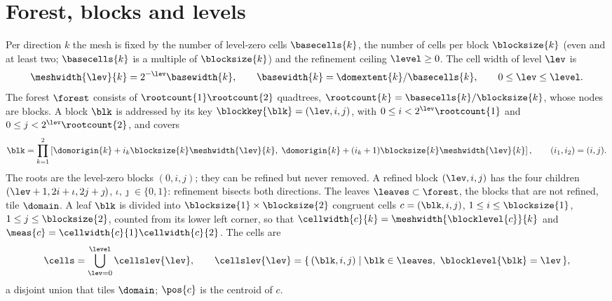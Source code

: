 \section{Forest, blocks and levels}\label{sec:mesh:forest}
Per direction $k$ the mesh is fixed by the number of level-zero cells
$\basecells{k}$, the number of cells per block $\blocksize{k}$ (even and at
least two; $\basecells{k}$ is a multiple of $\blocksize{k}$) and the
refinement ceiling $\level\ge0$. The cell width of level $\lev$ is
\begin{equation}\label{eq:mesh:widths}
  \meshwidth{\lev}{k}=2^{-\lev}\basewidth{k},\qquad
  \basewidth{k}=\domextent{k}/\basecells{k},\qquad 0\le\lev\le\level .
\end{equation}
The forest $\forest$ consists of $\rootcount{1}\rootcount{2}$ quadtrees,
$\rootcount{k}=\basecells{k}/\blocksize{k}$, whose nodes are blocks. A block
$\blk$ is addressed by its key $\blockkey{\blk}=(\lev,i,j)$, with
$0\le i<2^{\lev}\rootcount{1}$ and $0\le j<2^{\lev}\rootcount{2}$, and covers
\begin{equation}\label{eq:mesh:block-box}
  \blk=\prod_{k=1}^{2}\squarepar{\domorigin{k}+i_k\blocksize{k}\meshwidth{\lev}{k},\;
     \domorigin{k}+(i_k+1)\blocksize{k}\meshwidth{\lev}{k}},\qquad (i_1,i_2)=(i,j).
\end{equation}
The roots are the level-zero blocks $(0,i,j)$; they can be refined but never
removed. A refined block $(\lev,i,j)$ has the four children
$(\lev+1,2i+\iota,2j+\jmath)$, $\iota,\jmath\in\{0,1\}$: refinement bisects
both directions. The leaves $\leaves\subset\forest$, the blocks that are not
refined, tile $\domain$. A leaf $\blk$ is divided into
$\blocksize{1}\times\blocksize{2}$ congruent cells $c=(\blk,i,j)$,
$1\le i\le\blocksize{1}$, $1\le j\le\blocksize{2}$, counted from its lower
left corner, so that $\cellwidth{c}{k}=\meshwidth{\blocklevel{c}}{k}$ and
$\meas{c}=\cellwidth{c}{1}\cellwidth{c}{2}$. The cells are
\begin{equation}\label{eq:mesh:cells}
  \cells=\bigcup_{\lev=0}^{\level}\cellslev{\lev},\qquad
  \cellslev{\lev}=\set{(\blk,i,j)}{\blk\in\leaves,\ \blocklevel{\blk}=\lev},
\end{equation}
a disjoint union that tiles $\domain$; $\pos{c}$ is the centroid of $c$.

